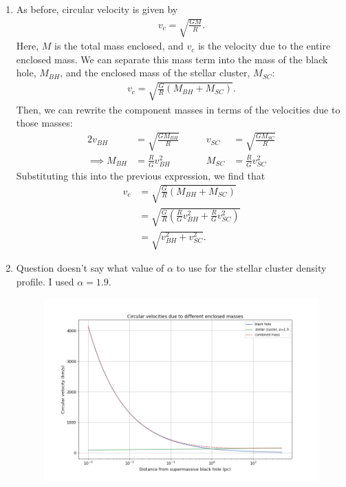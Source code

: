\documentclass[11pt,letterpaper]{article}
\begin{document}
\begin{enumerate}[label=(\alph*)]
    \item As before, circular velocity is given by 
        \begin{align*}
            v_c = \sqrt{\frac{GM}{R}}.
        \end{align*}
        Here, $M$ is the total mass enclosed, and $v_c$ is the velocity due to the entire enclosed mass. We can separate this mass term into the mass of the black hole, $M_{BH}$, and the enclosed mass of the stellar cluster, $M_{SC}$:
        \begin{align*}
            v_c = \sqrt{\frac{G}{R}(M_{BH}+M_{SC})}.
        \end{align*}
        Then, we can rewrite the component masses in terms of the velocities due to those masses:
        \begin{alignat*}{2}
            v_{BH} &= \sqrt{\frac{GM_{BH}}{R}} &\qquad v_{SC} &= \sqrt{\frac{GM_{SC}}{R}} \\
            \implies M_{BH} &= \frac{R}{G}v_{BH}^2 &\qquad M_{SC} &= \frac{R}{G}v_{SC}^2
        \end{alignat*}
        Substituting this into the previous expression, we find that 
        \begin{align*}
            v_c &= \sqrt{\frac{G}{R}(M_{BH}+M_{SC})} \\
            &= \sqrt{\frac{G}{R}\left(\frac{R}{G}v_{BH}^2+\frac{R}{G}v_{SC}^2\right)} \\
            &= \sqrt{v_{BH}^2 + v_{SC}^2}.
        \end{align*}

    \item Question doesn't say what value of $\alpha$ to use for the stellar cluster density profile. I used $\alpha=1.9$. 
        \begin{figure}[!htbp]
            \hspace{-3.cm}
            \includegraphics[width=1.4\linewidth]{velocity_curves.png}
        \end{figure}

\end{enumerate}
\end{document}
